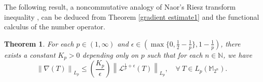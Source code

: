 \documentclass{amsbook}
\newtheorem{theorem}{Theorem}[chapter]
\theoremstyle{definition}
\theoremstyle{remark}
\numberwithin{section}{chapter}
\numberwithin{equation}{chapter}
\newcommand{\M}{\mathbb{M}}
\newcommand{\1}{\mathbf{1}}
\begin{document}
The following result,  a noncommutative analogy of Naor's Riesz transform inequality \cite[Proposition 43]{EI2020},  can be deduced from Theorem \ref{gradient estimate1} and the functional calculus of the number operator.

\begin{theorem}\label{Riesz-type 1}
For each $p\in(1,\infty)$ and $\epsilon\in(\max\{0,\frac{1}{2}-\frac{1}{p}\},1-\frac{1}{p})$, there exists a constant $K_{p}>0$ depending only on $p$ such that for each $n\in \mathbb{N}$, we have
\begin{equation}\label{Riesz-type 2}
\left\|\nabla(T)\right\|_{L_{p}}\leq \left(\frac{K_{p}}{\epsilon}\right)\left\|\mathcal{L}^{\frac{1}{p}+\epsilon}(T)\right\|_{L_{p}},\quad\forall~T\in L_{p}(\M_{2^{n}}).
\end{equation}
\end{theorem}
\end{document}
